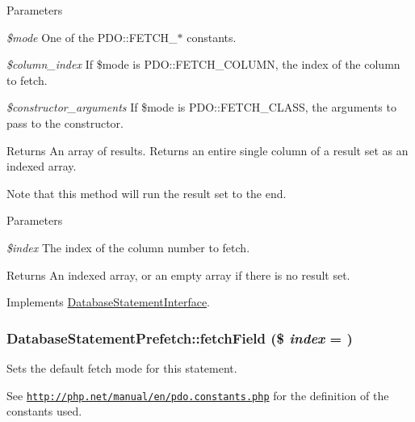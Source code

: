 \begin{DoxyParams}{Parameters}
\item[{\em \$mode}]One of the PDO::FETCH\_\-$\ast$ constants. \item[{\em \$column\_\-index}]If \$mode is PDO::FETCH\_\-COLUMN, the index of the column to fetch. \item[{\em \$constructor\_\-arguments}]If \$mode is PDO::FETCH\_\-CLASS, the arguments to pass to the constructor.\end{DoxyParams}
\begin{DoxyReturn}{Returns}
An array of results. Returns an entire single column of a result set as an indexed array.
\end{DoxyReturn}
Note that this method will run the result set to the end.


\begin{DoxyParams}{Parameters}
\item[{\em \$index}]The index of the column number to fetch.\end{DoxyParams}
\begin{DoxyReturn}{Returns}
An indexed array, or an empty array if there is no result set. 
\end{DoxyReturn}


Implements \hyperlink{interfaceDatabaseStatementInterface_a1c66bf4ef84ffd4710fa6545974cdf23}{DatabaseStatementInterface}.\hypertarget{classDatabaseStatementPrefetch_a98e507b8baa0b5aaf80fd51bd7989491}{
\subsubsection[{fetchField}]{\setlength{\rightskip}{0pt plus 5cm}DatabaseStatementPrefetch::fetchField (\$ {\em index} = {})}}
\label{classDatabaseStatementPrefetch_a98e507b8baa0b5aaf80fd51bd7989491}
Sets the default fetch mode for this statement.

See \href{http://php.net/manual/en/pdo.constants.php}{\tt http://php.net/manual/en/pdo.constants.php} for the definition of the constants used.


